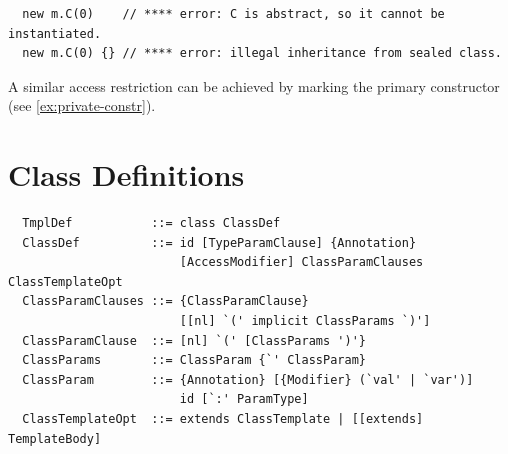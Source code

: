\begin{lstlisting}
  new m.C(0)    // **** error: C is abstract, so it cannot be instantiated.
  new m.C(0) {} // **** error: illegal inheritance from sealed class.
\end{lstlisting}

A similar access restriction can be achieved by marking the primary
constructor  (see \ref{ex:private-constr}).

\section{Class Definitions}
\label{sec:class-defs}

\syntax\begin{lstlisting} 
  TmplDef           ::= class ClassDef 
  ClassDef          ::= id [TypeParamClause] {Annotation} 
                        [AccessModifier] ClassParamClauses ClassTemplateOpt 
  ClassParamClauses ::= {ClassParamClause} 
                        [[nl] `(' implicit ClassParams `)']
  ClassParamClause  ::= [nl] `(' [ClassParams ')'} 
  ClassParams       ::= ClassParam {`' ClassParam}
  ClassParam        ::= {Annotation} [{Modifier} (`val' | `var')] 
                        id [`:' ParamType]
  ClassTemplateOpt  ::= extends ClassTemplate | [[extends] TemplateBody]
\end{lstlisting}

